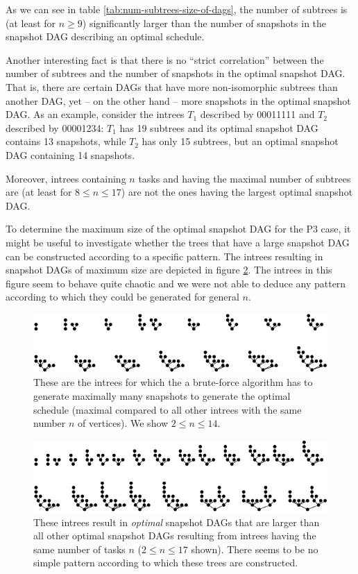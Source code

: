 As we can see in table \ref{tab:num-subtrees-size-of-dags}, the number of subtrees is (at least for $n\geq  9$) significantly larger than the number of snapshots in the snapshot DAG describing an optimal schedule.

Another interesting fact is that there is no ``strict correlation'' between the number of subtrees and the number of snapshots in the optimal snapshot DAG. That is, there are certain DAGs that have more non-isomorphic subtrees than another DAG, yet -- on the other hand -- more snapshots in the optimal snapshot DAG. As an example, consider the intrees $T_1$ described by 00011111 and $T_2$ described by 00001234: $T_1$ has 19 subtrees and its optimal snapshot DAG contains 13 snapshots, while $T_2$ has only 15 subtrees, but an optimal snapshot DAG containing 14 snapshots.

Moreover, intrees containing $n$ tasks and having the maximal number of subtrees are (at least for $8\leq n \leq 17$) are not the ones having the largest optimal snapshot DAG.

To determine the maximum size of the optimal snapshot DAG for the P3 case, it might be useful to investigate whether the trees that have a large snapshot DAG can be constructed according to a specific pattern. The intrees resulting in snapshot DAGs of maximum size are depicted in figure \ref{fig:intrees-maximum-snapshot-dag-size-p3}. The intrees in this figure seem to behave quite chaotic and we were not able to deduce any pattern according to which they could be generated for general $n$.

\begin{figure}[t]
  \centering
  \includegraphics[scale=1.4]{p3/max_unoptimized.pdf}
  \caption{These are the intrees for which the a brute-force algorithm has to generate maximally many snapshots to generate the optimal schedule (maximal compared to all other intrees with the same number $n$ of vertices). We show $2\leq n \leq 14$.}
  \label{fig:intrees-maximum-unoptimized-p3}
\end{figure}

\begin{figure}[t]
  \centering
  \includegraphics[scale=1.4]{p3/max_snapshot_dag.pdf}
  \caption{These intrees result in \emph{optimal} snapshot DAGs that are larger than all other optimal snapshot DAGs resulting from intrees having the same number of tasks $n$ ($2 \leq n \leq 17$ shown). There seems to be no simple pattern according to which these trees are constructed.}
  \label{fig:intrees-maximum-snapshot-dag-size-p3}
\end{figure}

